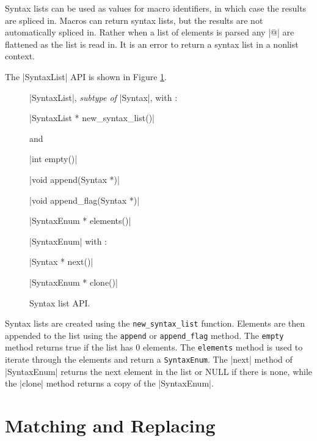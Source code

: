 Syntax lists can be used as values for macro identifiers, in which case
the results are spliced in.  Macros can return syntax lists, but the
results are not automatically spliced in.  Rather when a list of
elements is parsed any |@| are flattened as the list is read in.
It is an error to return a syntax list in a nonlist context.

The |SyntaxList| API is shown in Figure \ref{syntax_list-api}.
\begin{figure}
\begin{apil}
\item {} |SyntaxList|, \textit{subtype of} |Syntax|, with :
\begin{apill}
\item |SyntaxList * new_syntax_list()|
\end{apill}
and 
\begin{apill}
\item |int empty()|
\item |void append(Syntax *)|
\item |void append_flag(Syntax *)|
\item |SyntaxEnum * elements()|
\end{apill}
\item {} |SyntaxEnum| with :
\begin{apill}
\item |Syntax * next()|
\item |SyntaxEnum * clone()|
\end{apill}
\end{apil}
\caption{Syntax list API.}
\label{syntax_list-api}
\end{figure}
Syntax lists are created using the \verb/new_syntax_list/ function.
Elements are then appended to the list using the \verb/append/ or
\verb/append_flag/ method.  The \verb/empty/ method returns true if
the list has 0 elements.  The \verb/elements/ method is used to
iterate through the elements and return a \verb/SyntaxEnum/.  The
|next| method of |SyntaxEnum| returns the next element in the list or
NULL if there is none, while the |clone| method returns a copy of the
|SyntaxEnum|.

\section{Matching and Replacing}
\label{matching}

